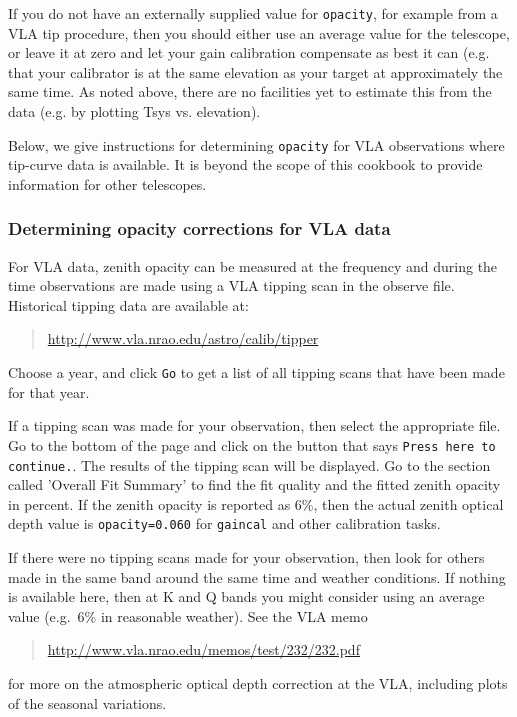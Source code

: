 If you do not have an externally supplied value for {\tt opacity}, for
example from a VLA tip procedure, then you should either use an
average value for the telescope, or leave it at zero and let
your gain calibration compensate as best it can (e.g. that your 
calibrator is at the same elevation as your target at approximately 
the same time.
As noted above, there are no facilities yet to estimate this from the
data (e.g. by plotting Tsys vs. elevation).

Below, we give instructions for determining {\tt opacity} for VLA 
observations where tip-curve data is available.  It is beyond the
scope of this cookbook to provide information for other telescopes.

\subsubsection{Determining opacity corrections for VLA data}
\label{section:cal.prior.opacity.vla}

For VLA data, zenith opacity can be measured at the frequency
and during the time observations are made using a VLA tipping scan in
the observe file.  Historical tipping data are available at:
\begin{quote}
   \url{http://www.vla.nrao.edu/astro/calib/tipper}
\end{quote}
Choose a year, and click {\tt Go} to get a list of all tipping scans
that have been made for that year.

If a tipping scan was made for your observation, then select the
appropriate file.  Go to the bottom of the page and click on the
button that says {\tt Press here to continue.}.  The results of the
tipping scan will be displayed.  Go to the section called 'Overall Fit
Summary' to find the fit quality and the fitted zenith opacity in
percent.  If the zenith opacity is reported as 6\%, then the actual
zenith optical depth value is {\tt opacity=0.060} for {\tt gaincal}
and other calibration tasks.

If there were no tipping scans made for your observation, then look
for others made in the same band around the same time and weather
conditions.  If nothing is available here, then at K and Q bands
you might consider using an average value (e.g.\ 6\% in reasonable
weather).  See the VLA memo
\begin{quote}
   \url{http://www.vla.nrao.edu/memos/test/232/232.pdf}
\end{quote}
for more on the atmospheric optical depth correction at the VLA,
including plots of the seasonal variations.

